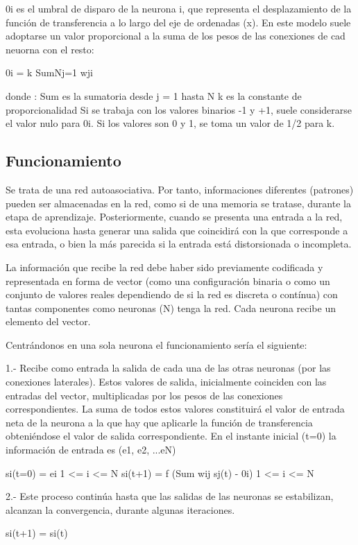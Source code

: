 \documentclass[letterpaper,12pt]{article}
\begin{document}
0i es el umbral de disparo de la neurona i, que representa el desplazamiento de la función de transferencia a lo largo del eje de ordenadas (x). En este modelo suele adoptarse un valor proporcional a la suma de los pesos de las conexiones de cad neuorna con el resto:

0i = k SumNj=1 wji

donde :\newline	 
 	Sum es la sumatoria desde j = 1 hasta N\newline
 	k es la constante de proporcionalidad\newline
Si se trabaja con los valores binarios -1 y +1, suele considerarse el valor nulo para 0i. Si los valores son 0 y 1, se toma un valor de 1/2 para k.\newline

\subsection{Funcionamiento}

Se trata de una red autoasociativa. Por tanto, informaciones diferentes (patrones) pueden ser almacenadas en la red, como si de una memoria se tratase, durante la etapa de aprendizaje. Posteriormente, cuando se presenta una entrada a la red, esta evoluciona hasta generar una salida que coincidirá con la que corresponde a esa entrada, o bien la más parecida si la entrada está distorsionada o incompleta.

La información que recibe la red debe haber sido previamente codificada y representada en forma de vector (como una configuración binaria o como un conjunto de valores reales dependiendo de si la red es discreta o contínua) con tantas componentes como neuronas (N) tenga la red. Cada neurona recibe un elemento del vector.

Centrándonos en una sola neurona el funcionamiento sería el siguiente:

\begin{center}
    
1.- Recibe como entrada la salida de cada una de las otras neuronas (por las conexiones laterales). Estos valores de salida, inicialmente coinciden con las entradas del vector, multiplicadas por los pesos de las conexiones correspondientes. La suma de todos estos valores constituirá el valor de entrada neta de la neurona a la que hay que aplicarle la función de transferencia obteniéndose el valor de salida correspondiente. En el instante inicial (t=0) la información de entrada es (e1, e2, ...eN)

\begin{center}
    si(t=0) = ei	 	1 <= i <= N\newline
si(t+1) = f (Sum wij sj(t) - 0i)	 	1 <= i <= N
\end{center}

2.- Este proceso continúa hasta que las salidas de las neuronas se estabilizan, alcanzan la convergencia, durante algunas iteraciones.

\begin{center}
    si(t+1) = si(t)
\end{center}

\end{center}
\end{document}
